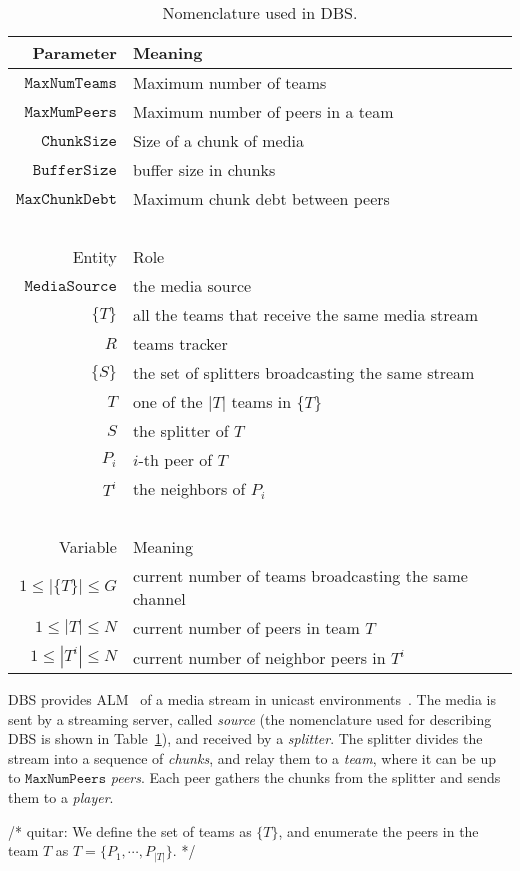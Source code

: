 \label{sec:DBS}

\begin{table}
  \begin{tabular}{rl}
    Parameter & Meaning \\
    \hline
    $\mathtt{MaxNumTeams}$  & Maximum number of teams \\
    $\mathtt{MaxMumPeers}$  & Maximum number of peers in a team \\
    $\mathtt{ChunkSize}$    & Size of a chunk of media \\
    $\mathtt{BufferSize}$   & buffer size in chunks \\
    $\mathtt{MaxChunkDebt}$ & Maximum chunk debt between peers \\
    ~\\
    Entity  & Role \\
    \hline
    $\mathtt{MediaSource}$  & the media source \\
    $\{T\}$ & all the teams that receive the same media stream \\
    $R$     & teams tracker \\
    $\{S\}$ & the set of splitters broadcasting the same stream \\
    $T$     & one of the $|T|$ teams in $\{T\}$ \\
    $S$     & the splitter of $T$ \\
    $P_i$   & $i$-th peer of $T$ \\
    $T^i$   & the neighbors of $P_i$ \\
    ~\\
    Variable            & Meaning \\
    \hline
    $1\leq |\{T\}|\leq G$ & current number of teams broadcasting the same channel \\
    $1\leq |T|\leq N$     & current number of peers in team $T$ \\
    $1\leq |T^i|\leq N$   & current number of neighbor peers in $T^i$ \\
  \end{tabular}
  \caption{Nomenclature used in DBS.\label{tab:DBS_nomenclature}}
\end{table}

DBS provides ALM~\cite{banerjee2002scalable} of a media stream in
unicast environments~\cite{comer2003computer}. The media is sent by a
streaming server, called \emph{source} (the nomenclature used for
describing DBS is shown in Table~\ref{tab:DBS_nomenclature}), and
received by a \emph{splitter}. The splitter divides the stream into a
sequence of \emph{chunks}, and relay them to a \emph{team}, where it
can be up to $\mathtt{MaxNumPeers}$ \emph{peers}. Each peer gathers
the chunks from the splitter and sends them to a \emph{player}.

/* quitar: We define the set of teams as
$\{T\}$,
and enumerate the peers in the team $T$ as $T=\{P_1,\cdots,P_{|T|}\}$. */
